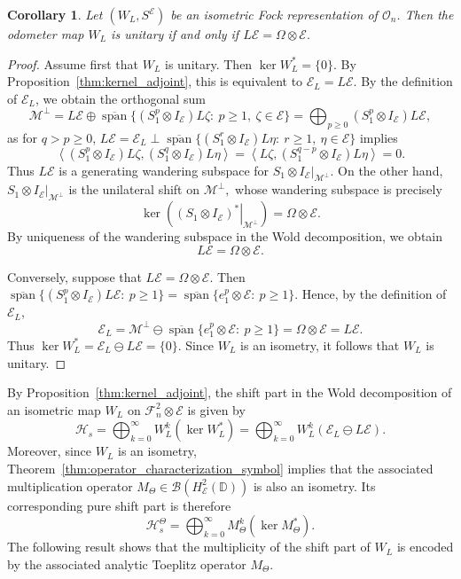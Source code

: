 \documentclass[12pt]{amsart}
\newtheorem{corollary}[theorem]{Corollary}
\theoremstyle{definition}
\theoremstyle{remark}
\def \D{\mathbb{D}}
\newcommand{\clb}{\mathcal{B}}
\newcommand{\cle}{\mathcal{E}}
\newcommand{\clh}{\mathcal{H}}
\newcommand{\clm}{\mathcal{M}}
\newcommand{\clf}{\mathcal{F}}
\newcommand{\clo}{\mathcal{O}}
\newcommand\restr[2]{\ensuremath{\left.#1\right|_{#2}}}
\numberwithin{equation}{section}
\begin{document}
\begin{corollary}\label{cor:unitary_WL}
Let $(W_L,S^\cle)$ be an isometric Fock representation of $\clo_n$. Then the
odometer map $W_L$ is unitary if and only if $L\cle=\Omega\otimes\cle.$
\end{corollary}
\begin{proof}
Assume first that \(W_L\) is unitary. Then $\ker W_L^*=\{0\}.$
By Proposition~\ref{thm:kernel_adjoint}, this is equivalent to $\cle_L=L\cle.$ By the definition of
$\cle_L$, we obtain the orthogonal sum 
\[
\clm^\perp
=
L\cle
\oplus
\overline{\operatorname{span}}
\{(S_1^p\otimes I_\cle)L\zeta:\ p\ge1,\ \zeta\in\cle\}
=
\bigoplus_{p\ge0}(S_1^p\otimes I_\cle)L\cle,
\]
as for $q>p\ge0$,  $L\cle=\cle_L \perp \overline{\operatorname{span}}
\{(S_1^r\otimes I_\cle)L\eta:\ r\ge1,\ \eta\in\cle\}$ implies
\[
\left\langle
(S_1^p\otimes I_\cle)L\zeta,
(S_1^q\otimes I_\cle)L\eta
\right\rangle
=
\left\langle
L\zeta,
(S_1^{q-p}\otimes I_\cle)L\eta
\right\rangle
=0.
\]
Thus $L\cle$ is a generating wandering subspace for
$\restr{S_1\otimes I_\cle}{\clm^\perp}$. On the other hand, $\restr{S_1\otimes I_\cle}{\clm^\perp}$
is the unilateral shift on $\clm^\perp,$
whose wandering subspace is precisely
\[
\ker\left(\restr{(S_1\otimes I_\cle)^*}{\clm^\perp}\right)
=
\Omega\otimes\cle.
\]
By uniqueness of the wandering subspace in the Wold decomposition, we obtain
\[
L\cle=\Omega\otimes\cle.
\]


Conversely, suppose that $L\cle=\Omega\otimes\cle$. Then $\overline{\operatorname{span}}
\{(S_1^p\otimes I_\cle)L\cle:\ p\ge1\}
=
\overline{\operatorname{span}}\{e_1^p\otimes\cle:\ p\ge1\}.$
Hence, by the definition of $\cle_L$,
\[
\cle_L
=
\clm^\perp
\ominus
\overline{\operatorname{span}}\{e_1^p\otimes\cle:\ p\ge1\}
=
\Omega\otimes\cle
=
L\cle.
\]
Thus $\ker W_L^*
=
\cle_L\ominus L\cle
=
\{0\}.$
Since $W_L$ is an isometry, it follows that $W_L$ is unitary.
\end{proof}


By Proposition~\ref{thm:kernel_adjoint}, the shift part in the Wold decomposition of an isometric map \(W_L\) on
\(\clf_n^2\otimes\cle\) is given by
\[
\clh_s
=
\bigoplus_{k=0}^{\infty} W_L^k(\ker W_L^*)
=
\bigoplus_{k=0}^{\infty} W_L^k(\cle_L\ominus L\cle).
\]
Moreover, since \(W_L\) is an isometry, Theorem~\ref{thm:operator_characterization_symbol}
implies that the associated multiplication operator
\(M_\Theta\in\clb(H^2_\cle(\D))\) is also an isometry. Its corresponding
pure shift part is therefore
\[
\clh_s^\Theta
=
\bigoplus_{k=0}^{\infty} M_\Theta^k(\ker M_\Theta^*).
\]
The following result shows that the multiplicity of the shift part of \(W_L\)
is encoded by the associated analytic Toeplitz operator \(M_\Theta\).
\end{document}
